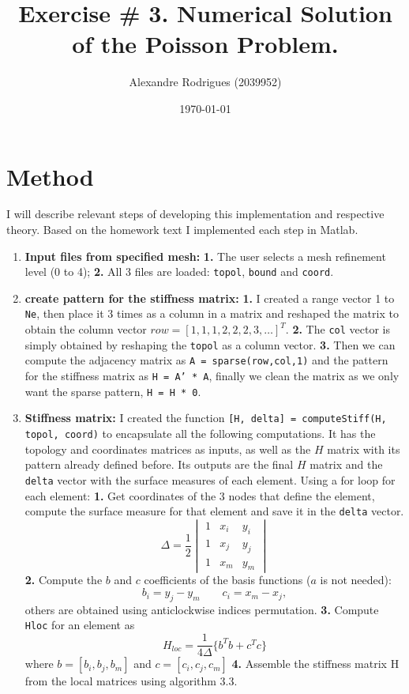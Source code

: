 \documentclass[a4paper, 11pt]{article}
\begin{document}
	
	\title{Exercise \# 3. Numerical Solution of the Poisson Problem. }
	\author{{\small Alexandre Rodrigues (2039952)}}
	\date{\today}
	
	\maketitle
		\section{Method}
			I will describe relevant steps of developing this implementation and respective theory.
			Based on the homework text I implemented each step in Matlab.
			
			\begin{enumerate}
				\item \textbf{Input files from specified mesh:}
					\subitem \textbf{1.} The user selects a mesh refinement level (0 to 4);
					\subitem \textbf{2.} All 3 files are loaded: \texttt{topol}, \texttt{bound} and \texttt{coord}.	
				
				\item \textbf{create pattern for the stiffness matrix:} 
					\subitem \textbf{1.} I created a range vector 1 to \texttt{Ne}, then place it 3 times as a column in a matrix and reshaped the matrix to obtain the column vector $ row = [1,1,1,2,2,2,3,\ldots]^T $. 
					\subitem \textbf{2.} The \texttt{col} vector is simply obtained by reshaping the \texttt{topol} as a column vector. 
					\subitem \textbf{3.} Then we can compute the adjacency matrix as \texttt{A = sparse(row,col,1)} and the pattern for the stiffness matrix as \texttt{H = A' * A}, finally we clean the matrix as we only want the sparse pattern, \texttt{H = H * 0}.
				
				\item \textbf{Stiffness matrix:}
					I created the function \texttt{[H, delta] = computeStiff(H, topol, coord)} to encapsulate all the following computations.
					It has the topology and coordinates matrices as inputs, as well as the $ H $ matrix with its pattern already defined before.
					Its outputs are the final $ H $ matrix and the \texttt{delta} vector with the surface measures of each element.
					Using a for loop for each element:
					\subitem \textbf{1.} Get coordinates of the 3 nodes that define the element, compute the surface measure for that element and save it in the \texttt{delta} vector.
					$$ \Delta = \frac{1}{2} \begin{vmatrix} 1 & x_i & y_i \\ 1 & x_j & y_j \\ 1 & x_m & y_m \end{vmatrix} $$
					\subitem \textbf{2.} Compute the $ b $ and $ c  $ coefficients of the basis functions ($a$ is not needed): 
					$$  b_i = y_j - y_m  \qquad c_i = x_m - x_j ,$$ others are obtained using anticlockwise indices permutation.
					\subitem \textbf{3.} Compute \texttt{Hloc} for an element as 
					$$ H_{loc} = \frac{1}{4\Delta}\{ b^Tb + c^Tc \} $$ 
					where $ b = [b_i, b_j, b_m]$ and $ c = [c_i, c_j, c_m]$
					\subitem \textbf{4.} Assemble the stiffness matrix H from the local matrices using algorithm 3.3.
				

\end{enumerate}
\end{document}
